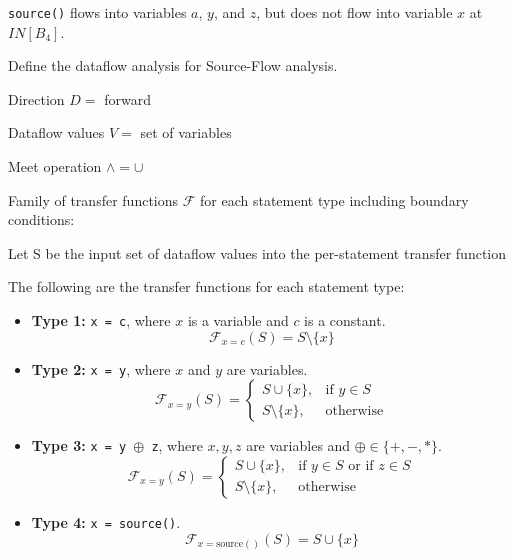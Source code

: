 \documentclass[12pt]{article}
\begin{document}
\begin{enumerate}
      \lstinline$source()$ flows into variables $a$, $y$, and $z$, but does not
      flow into variable $x$ at $IN[B_4]$.

      Define the dataflow analysis for Source-Flow analysis.

      \begin{mdframed}
        Direction $D = $ forward

        Dataflow values $V = $ set of variables

        Meet operation $\wedge = \cup $

        Family of transfer functions $\mathcal{F}$ for each statement type
        including boundary conditions:

        Let S be the input set of dataflow values into the per-statement transfer function

        The following are the transfer functions for each statement type:

        \begin{itemize}

            \item \textbf{Type 1:} \texttt{x = c}, where $x$ is a variable and $c$ is a constant.
            \[
                \mathcal{F}_{x = c}(S) = S \setminus \{x\}
            \]

            \item \textbf{Type 2:} \texttt{x = y}, where $x$ and $y$ are variables.
            \[
                \mathcal{F}_{x = y}(S) =
                \begin{cases}
                    S \cup \{x\}, & \text{if } y \in S \\
                    S \setminus \{x\}, & \text{otherwise}
                \end{cases}
            \]

            \item \textbf{Type 3:} \texttt{x = y $\oplus$ z}, where $x, y, z$ are variables and $\oplus \in \{+, -, *\}$.
            \[
                \mathcal{F}_{x = y}(S) =
                \begin{cases}
                    S \cup \{x\}, & \text{if } y \in S \text{ or } \text{if } z \in S \\
                    S \setminus \{x\}, & \text{otherwise}
                \end{cases}
            \]

            \item \textbf{Type 4:} \texttt{x = source()}.
            \[
                \mathcal{F}_{x = \text{source}()}(S) = S \cup \{x\}
            \]


\end{itemize}
\end{mdframed}
\end{enumerate}
\end{document}
